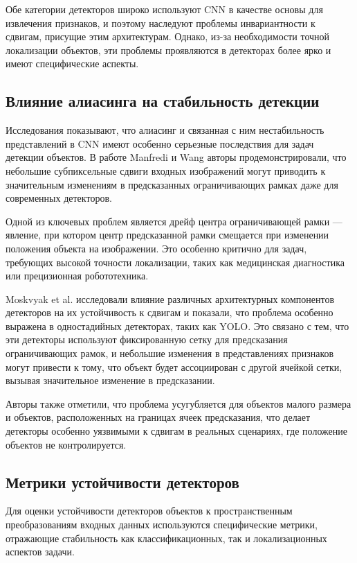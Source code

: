 Обе категории детекторов широко используют CNN в качестве основы для извлечения признаков, и поэтому наследуют проблемы инвариантности к сдвигам, присущие этим архитектурам. Однако, из-за необходимости точной локализации объектов, эти проблемы проявляются в детекторах более ярко и имеют специфические аспекты.

\subsection{Влияние алиасинга на стабильность детекции}
\label{review:detectors:aliasing}

Исследования показывают, что алиасинг и связанная с ним нестабильность представлений в CNN имеют особенно серьезные последствия для задач детекции объектов. В работе Manfredi и Wang \cite{Manfredi2020} авторы продемонстрировали, что небольшие субпиксельные сдвиги входных изображений могут приводить к значительным изменениям в предсказанных ограничивающих рамках даже для современных детекторов.

Одной из ключевых проблем является дрейф центра ограничивающей рамки — явление, при котором центр предсказанной рамки смещается при изменении положения объекта на изображении. Это особенно критично для задач, требующих высокой точности локализации, таких как медицинская диагностика или прецизионная робототехника.

Moskvyak et al. \cite{Moskvyak2021} исследовали влияние различных архитектурных компонентов детекторов на их устойчивость к сдвигам и показали, что проблема особенно выражена в одностадийных детекторах, таких как YOLO. Это связано с тем, что эти детекторы используют фиксированную сетку для предсказания ограничивающих рамок, и небольшие изменения в представлениях признаков могут привести к тому, что объект будет ассоциирован с другой ячейкой сетки, вызывая значительное изменение в предсказании.

Авторы также отметили, что проблема усугубляется для объектов малого размера и объектов, расположенных на границах ячеек предсказания, что делает детекторы особенно уязвимыми к сдвигам в реальных сценариях, где положение объектов не контролируется.

\subsection{Метрики устойчивости детекторов}
\label{review:detectors:metrics}

Для оценки устойчивости детекторов объектов к пространственным преобразованиям входных данных используются специфические метрики, отражающие стабильность как классификационных, так и локализационных аспектов задачи.

